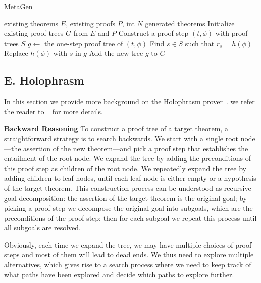 \documentclass{article}
\begin{document}
\begin{algorithm}[!ht]
   \caption{MetaGen}
   \label{algo:metagen}
\begin{algorithmic}
 existing theorems $E$, existing proofs $P$, int $N$
 generated theorems
\STATE Initialize existing proof trees $G$ from $E$ and $P$
\REPEAT
    \STATE Construct a proof step $(t,\phi)$ with proof trees $S$
    \STATE $g\leftarrow$ the one-step proof tree of $(t,\phi)$
        \STATE{}
        \STATE Find $s\in S$ such that $r_s=h(\phi)$
        \STATE Replace $h(\phi)$ with $s$ in $g$ 
    \ENDFOR
    \STATE Add the new tree $g$ to $G$
\end{algorithmic}
\end{algorithm} 

\subsection*{E. Holophrasm}
\label{app:holophrasm}

In this section we provide more background on the Holophrasm prover~\cite{whalen2016holophrasm}. we refer the reader to ~\citet{whalen2016holophrasm} for more details. 

\noindent\textbf{Backward Reasoning}
To construct a proof tree of a target theorem, a straightforward strategy is to search backwards. We start with a single root node---the assertion of the new theorem---and pick a proof step that  establishes the entailment of the root node. We expand the tree by adding the preconditions of this proof step as children of the root node. 
We repeatedly expand the tree by adding children to leaf nodes, until each leaf node is either empty or a hypothesis of the target theorem. This construction process can be understood as recursive goal decomposition: the assertion of the target theorem is the original goal; by picking a proof step we decompose the original goal into subgoals, which are the preconditions of the proof step; then for each subgoal we repeat this process until all subgoals are resolved. 

Obviously, each time we expand the tree, we may have multiple choices of proof steps and most of them will lead to dead ends. We thus need to explore multiple alternatives, which gives rise to a search process where we need to keep track of what paths  have been explored and decide which paths to explore further.
\end{document}
